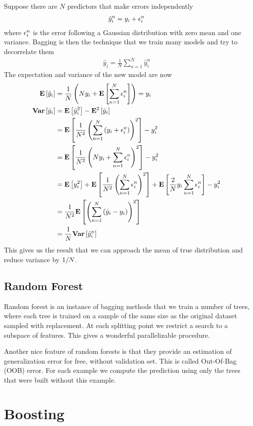 Suppose there are $N$ predictors that make errors independently
\begin{align*}
\hat{y}_i^n=y_i+\epsilon_i^n
\end{align*}
where $\epsilon_i^n$ is the error following a Gaussian distribution with zero mean and one variance. Bagging is then the technique that we train many models and try to decorrelate them
\begin{align*}
\hat{y}_i=\frac{1}{N}\sum_{n=1}^N\hat{y}_i^n
\end{align*}
The expectation and variance of the new model are now
\begin{align*}
\mathbf{E}\left[\hat{y}_i\right]&=\frac{1}{N}\left(Ny_i+\mathbf{E}\left[\sum_{n=1}^N\epsilon_i^n\right]\right)=y_i \\
\mathbf{Var}\left[\hat{y}_i\right]&=\mathbf{E}\left[\hat{y}_i^2\right]-\mathbf{E}^2\left[\hat{y}_i\right] \\
&=\mathbf{E}\left[\frac{1}{N^2}\left(\sum_{n=1}^N\left(y_i+\epsilon_i^n\right)\right)^2\right]-y_i^2 \\
&=\mathbf{E}\left[\frac{1}{N^2}\left(Ny_i+\sum_{n=1}^N\epsilon_i^n\right)^2\right]-y_i^2 \\
&=\mathbf{E}\left[y_i^2\right]+\mathbf{E}\left[\frac{1}{N^2}\left(\sum_{n=1}^N\epsilon_i^n\right)^2\right]+\mathbf{E}\left[\frac{2}{N}y_i\sum_{n=1}^N\epsilon_i^n\right]-y_i^2 \\
&=\frac{1}{N^2}\mathbf{E}\left[\left(\sum_{n=1}^N\left(\hat{y}_i-y_i\right)\right)^2\right] \\
&=\frac{1}{N}\mathbf{Var}\left[\hat{y}_i^n\right]
\end{align*}
This gives us the result that we can approach the mean of true distribution and reduce variance by $1/N$.

\subsection{Random Forest}

Random forest is an instance of bagging methods that we train a number of trees, where each tree is trained on a sample of the same size as the original dataset sampled with replacement. At each splitting point we restrict a search to a subspace of features. This gives a wonderful parallelizable procedure.

Another nice feature of random forests is that they provide an estimation of generalization error for free, without validation set. This is called Out-Of-Bag (OOB) error. For each example we compute the prediction using only the trees that were built without this example.



\section{Boosting}
\label{section9.3}

